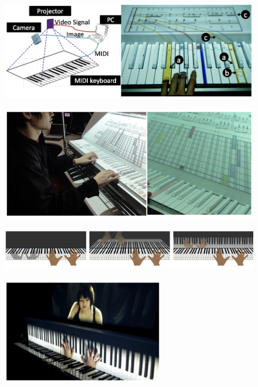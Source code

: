 \documentclass[manuscript,screen]{acmart}
\begin{document}
\begin{figure}
    \centering
    \includegraphics[width=15cm]{figures/takegawasetup.png}
    \caption{\cite{takegawa2012piano} }
    \label{fig:View from the HeadMounted}
\end{figure}

\begin{figure}
    \centering
    \includegraphics[width=15cm]{figures/takegawapianoroll.png}
    \caption{\cite{takegawa2012piano} }
    \label{fig:View from the HeadMounted}
\end{figure}

\begin{figure}
    \centering
    \includegraphics[width=15cm]{figures/xiaomirror3interfaces.png}
    \caption{\cite{xiao2010mirrorfugue} }
    \label{fig:View from the HeadMounted}
\end{figure}

\begin{figure}
    \centering
    \includegraphics[width=7cm]{figures/xiaomirrorfugue3.png}
    \caption{\cite{xiao2013mirrorfugue} }
    \label{fig:xiao2013mirror}
\end{figure}
\end{document}
